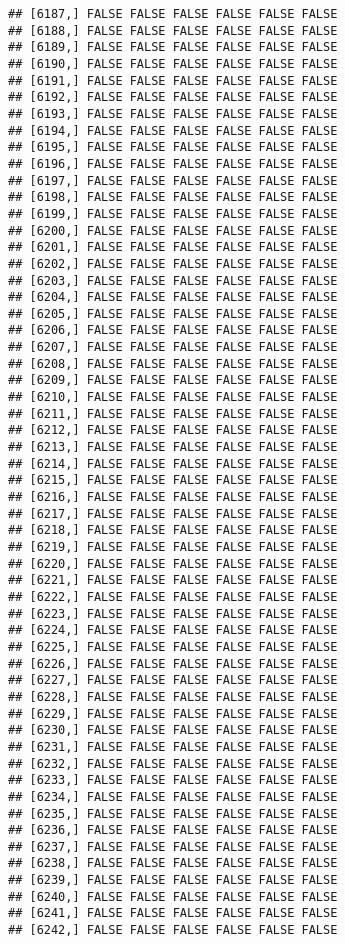 \documentclass[
]{article}
\begin{document}
\begin{verbatim}
## [6187,] FALSE FALSE FALSE FALSE FALSE FALSE
## [6188,] FALSE FALSE FALSE FALSE FALSE FALSE
## [6189,] FALSE FALSE FALSE FALSE FALSE FALSE
## [6190,] FALSE FALSE FALSE FALSE FALSE FALSE
## [6191,] FALSE FALSE FALSE FALSE FALSE FALSE
## [6192,] FALSE FALSE FALSE FALSE FALSE FALSE
## [6193,] FALSE FALSE FALSE FALSE FALSE FALSE
## [6194,] FALSE FALSE FALSE FALSE FALSE FALSE
## [6195,] FALSE FALSE FALSE FALSE FALSE FALSE
## [6196,] FALSE FALSE FALSE FALSE FALSE FALSE
## [6197,] FALSE FALSE FALSE FALSE FALSE FALSE
## [6198,] FALSE FALSE FALSE FALSE FALSE FALSE
## [6199,] FALSE FALSE FALSE FALSE FALSE FALSE
## [6200,] FALSE FALSE FALSE FALSE FALSE FALSE
## [6201,] FALSE FALSE FALSE FALSE FALSE FALSE
## [6202,] FALSE FALSE FALSE FALSE FALSE FALSE
## [6203,] FALSE FALSE FALSE FALSE FALSE FALSE
## [6204,] FALSE FALSE FALSE FALSE FALSE FALSE
## [6205,] FALSE FALSE FALSE FALSE FALSE FALSE
## [6206,] FALSE FALSE FALSE FALSE FALSE FALSE
## [6207,] FALSE FALSE FALSE FALSE FALSE FALSE
## [6208,] FALSE FALSE FALSE FALSE FALSE FALSE
## [6209,] FALSE FALSE FALSE FALSE FALSE FALSE
## [6210,] FALSE FALSE FALSE FALSE FALSE FALSE
## [6211,] FALSE FALSE FALSE FALSE FALSE FALSE
## [6212,] FALSE FALSE FALSE FALSE FALSE FALSE
## [6213,] FALSE FALSE FALSE FALSE FALSE FALSE
## [6214,] FALSE FALSE FALSE FALSE FALSE FALSE
## [6215,] FALSE FALSE FALSE FALSE FALSE FALSE
## [6216,] FALSE FALSE FALSE FALSE FALSE FALSE
## [6217,] FALSE FALSE FALSE FALSE FALSE FALSE
## [6218,] FALSE FALSE FALSE FALSE FALSE FALSE
## [6219,] FALSE FALSE FALSE FALSE FALSE FALSE
## [6220,] FALSE FALSE FALSE FALSE FALSE FALSE
## [6221,] FALSE FALSE FALSE FALSE FALSE FALSE
## [6222,] FALSE FALSE FALSE FALSE FALSE FALSE
## [6223,] FALSE FALSE FALSE FALSE FALSE FALSE
## [6224,] FALSE FALSE FALSE FALSE FALSE FALSE
## [6225,] FALSE FALSE FALSE FALSE FALSE FALSE
## [6226,] FALSE FALSE FALSE FALSE FALSE FALSE
## [6227,] FALSE FALSE FALSE FALSE FALSE FALSE
## [6228,] FALSE FALSE FALSE FALSE FALSE FALSE
## [6229,] FALSE FALSE FALSE FALSE FALSE FALSE
## [6230,] FALSE FALSE FALSE FALSE FALSE FALSE
## [6231,] FALSE FALSE FALSE FALSE FALSE FALSE
## [6232,] FALSE FALSE FALSE FALSE FALSE FALSE
## [6233,] FALSE FALSE FALSE FALSE FALSE FALSE
## [6234,] FALSE FALSE FALSE FALSE FALSE FALSE
## [6235,] FALSE FALSE FALSE FALSE FALSE FALSE
## [6236,] FALSE FALSE FALSE FALSE FALSE FALSE
## [6237,] FALSE FALSE FALSE FALSE FALSE FALSE
## [6238,] FALSE FALSE FALSE FALSE FALSE FALSE
## [6239,] FALSE FALSE FALSE FALSE FALSE FALSE
## [6240,] FALSE FALSE FALSE FALSE FALSE FALSE
## [6241,] FALSE FALSE FALSE FALSE FALSE FALSE
## [6242,] FALSE FALSE FALSE FALSE FALSE FALSE

\end{verbatim}
\end{document}

